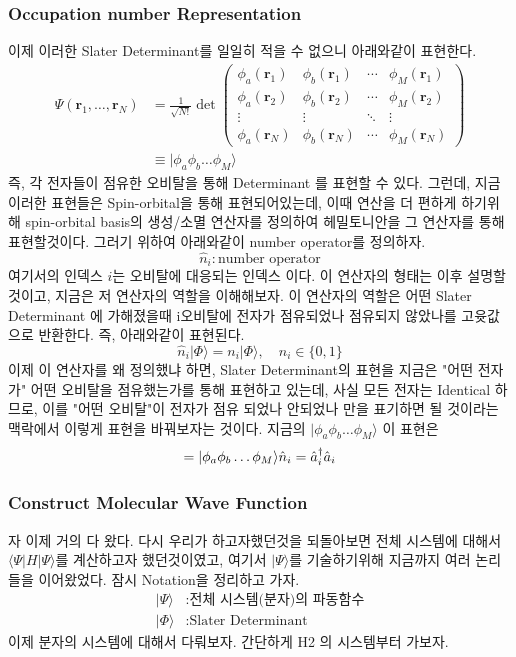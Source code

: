 \documentclass[10pt]{article}
\begin{document}
\subsubsection{Occupation number Representation}
이제 이러한 Slater Determinant를 일일히 적을 수 없으니 아래와같이 표현한다. 
\begin{align*}
\Psi(\mathbf{r}_1, \dots, \mathbf{r}_N) 
&= \frac{1}{\sqrt{N!}} \det \begin{pmatrix}
\phi_a(\mathbf{r}_1) & \phi_b(\mathbf{r}_1) & \cdots & \phi_M(\mathbf{r}_1) \\
\phi_a(\mathbf{r}_2) & \phi_b(\mathbf{r}_2) & \cdots & \phi_M(\mathbf{r}_2) \\
\vdots & \vdots & \ddots & \vdots \\
\phi_a(\mathbf{r}_N) & \phi_b(\mathbf{r}_N) & \cdots & \phi_M(\mathbf{r}_N) 
\end{pmatrix} \\
& \equiv \vert \phi_a \phi_b \dots \phi_M\rangle
\end{align*}
즉, 각 전자들이 점유한 오비탈을 통해 Determinant 를 표현할 수 있다. 
그런데, 지금 이러한 표현들은 Spin-orbital을 통해 표현되어있는데, 이때 연산을 더 편하게 하기위해 spin-orbital basis의 생성/소멸 연산자를 정의하여 헤밀토니안을 그 연산자를 통해 표현할것이다. 
그러기 위하여 아래와같이 number operator를 정의하자. 
\[
\hat{n}_i : \text{number operator}
\]
여기서의 인덱스 \(i\)는 오비탈에 대응되는 인덱스 이다. 이 연산자의 형태는 이후 설명할것이고, 지금은 저 연산자의 역할을 이해해보자. 
이 연산자의 역할은 어떤 Slater Determinant 에 가해졌을때 i오비탈에 전자가 점유되었나 점유되지 않았나를 고윳값으로 반환한다. 즉, 아래와같이 표현된다. 
\[
\hat{n}_i | \Phi \rangle = n_i | \Phi \rangle, \quad n_i \in \{0,1\}
\]
이제 이 연산자를 왜 정의했냐 하면, Slater Determinant의 표현을 지금은 "어떤 전자가" 어떤 오비탈을 점유했는가를 통해 표현하고 있는데, 
사실 모든 전자는 Identical 하므로, 이를 "어떤 오비탈"이 전자가 점유 되었나 안되었나 만을 표기하면 될 것이라는 맥락에서 이렇게 표현을 바꿔보자는 것이다. 
지금의 \(\vert \phi_a \phi_b \dots \phi_M\rangle\) 이 표현은 
\[
= \vert \phi_a \phi_b \dots \phi_M \rangle \\
\hat{n}_i = \hat{a}_i^{\dagger}\hat{a}_i
\]


\subsubsection{Construct Molecular Wave Function}
자 이제 거의 다 왔다. 다시 우리가 하고자했던것을 되돌아보면 전체 시스템에 대해서 \(\langle \Psi|H|\Psi \rangle\)를 계산하고자 했던것이였고, 
여기서 \(|\Psi \rangle \)를 기술하기위해 지금까지 여러 논리들을 이어왔었다. 
잠시 Notation을 정리하고 가자. 
\begin{align*}
| \Psi \rangle &: \text{전체 시스템(분자)의 파동함수}\\
| \Phi \rangle &: \text{Slater Determinant}
\end{align*}
이제 분자의 시스템에 대해서 다뤄보자. 
간단하게 H2 의 시스템부터 가보자. 
\end{document}
